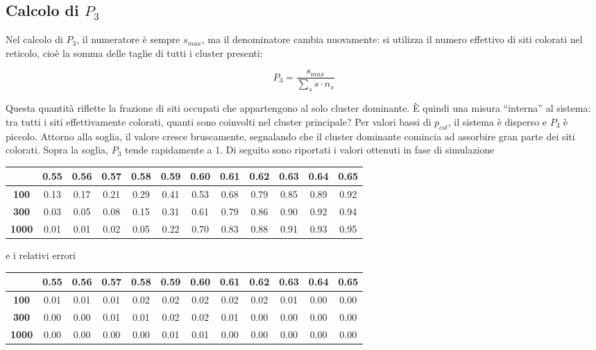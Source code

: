 \subsection{Calcolo di $P_{3}$}

Nel calcolo di $P_3$, il numeratore è sempre $s_{max}$, ma il denominatore cambia nuovamente: si utilizza il numero effettivo di siti colorati nel reticolo, cioè la somma delle taglie di tutti i cluster presenti:

\vspace{4px}
\begin{equation}
P_3 = \frac{s_{max}}{\sum_{s} s \cdot n_s}
\end{equation}

\vspace{4px}
\noindent
Questa quantità riflette la frazione di siti occupati che appartengono al solo cluster dominante. È quindi una misura “interna” al sistema: tra tutti i siti effettivamente colorati, quanti sono coinvolti nel cluster principale? Per valori bassi di $p_{col}$, il sistema è disperso e $P_3$ è piccolo. Attorno alla soglia, il valore cresce bruscamente, segnalando che il cluster dominante comincia ad assorbire gran parte dei siti colorati. Sopra la soglia, $P_3$ tende rapidamente a 1. Di seguito sono riportati i valori ottenuti in fase di simulazione

\vspace{15px}
\noindent
\begin{tabular}{|c|*{11}{c|}}
	\hline
	\textbf{} & \textbf{0.55} & \textbf{0.56} & \textbf{0.57} & \textbf{0.58} & \textbf{0.59} & \textbf{0.60} & \textbf{0.61} & \textbf{0.62} & \textbf{0.63} & \textbf{0.64} & \textbf{0.65} \\
	\hline
	\textbf{100}  & 0.13 & 0.17 & 0.21 & 0.29 & 0.41 & 0.53 & 0.68 & 0.79 & 0.85 & 0.89 & 0.92 \\
	\hline
	\textbf{300}  & 0.03 & 0.05 & 0.08 & 0.15 & 0.31 & 0.61 & 0.79 & 0.86 & 0.90 & 0.92 & 0.94 \\
	\hline
	\textbf{1000} & 0.01 & 0.01 & 0.02 & 0.05 & 0.22 & 0.70 & 0.83 & 0.88 & 0.91 & 0.93 & 0.95 \\
	\hline
\end{tabular}

\vspace{15px}
\noindent
e i relativi errori

\vspace{15px}
\noindent
\begin{tabular}{|c|*{11}{c|}}
	\hline
	\textbf{} & \textbf{0.55} & \textbf{0.56} & \textbf{0.57} & \textbf{0.58} & \textbf{0.59} & \textbf{0.60} & \textbf{0.61} & \textbf{0.62} & \textbf{0.63} & \textbf{0.64} & \textbf{0.65} \\
	\hline
	\textbf{100}  & 0.01 & 0.01 & 0.01 & 0.02 & 0.02 & 0.02 & 0.02 & 0.02 & 0.01 & 0.00 & 0.00 \\
	\hline
	\textbf{300}  & 0.00 & 0.00 & 0.01 & 0.01 & 0.02 & 0.02 & 0.01 & 0.00 & 0.00 & 0.00 & 0.00 \\
	\hline
	\textbf{1000} & 0.00 & 0.00 & 0.00 & 0.00 & 0.01 & 0.01 & 0.00 & 0.00 & 0.00 & 0.00 & 0.00 \\
	\hline
\end{tabular}

